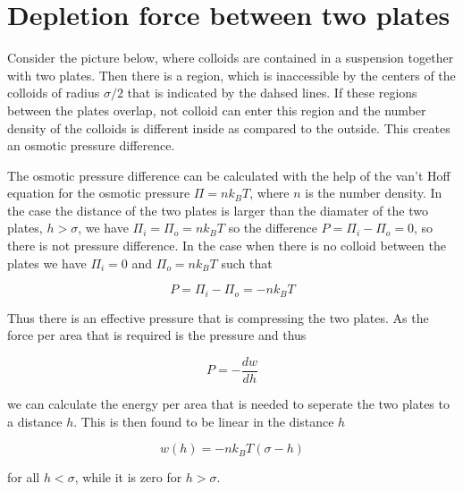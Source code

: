 \documentclass[letterpaper,10pt,english]{sphinxmanual}
\let\sphinxpxdimen\pdfpxdimen\else\newdimen\sphinxpxdimen
\begin{document}
\section{Depletion force between two plates}
\label{\detokenize{notebooks/L12/1_depletion_forces:Depletion-force-between-two-plates}}
\sphinxAtStartPar
Consider the picture below, where colloids are contained in a suspension together with two plates. Then there is a region, which is inaccessible by the centers of the colloids of radius \(\sigma/2\) that is indicated by the dahsed lines. If these regions between the plates overlap, not colloid can enter this region and the number density of the colloids is different inside as compared to the outside. This creates an osmotic pressure difference.

\noindent\sphinxincludegraphics[width=346\sphinxpxdimen,height=291\sphinxpxdimen]{{depletion_plates}.png}

\sphinxAtStartPar
The osmotic pressure difference can be calculated with the help of the van’t Hoff equation for the osmotic pressure \(\Pi=nk_B T\), where \(n\) is the number density. In the case the distance of the two plates is larger than the diamater of the two plates, \(h>\sigma\), we have \(\Pi_i=\Pi_o= nk_B T\) so the difference \(P=\Pi_i-\Pi_o=0\), so there is not pressure difference. In the case when there is no colloid between the plates we have \(\Pi_i =0\) and
\(\Pi_o =nk_B T\) such that

\sphinxAtStartPar
\begin{equation}
P=\Pi_i-\Pi_o=-nk_B T
\end{equation}

\sphinxAtStartPar
Thus there is an effective pressure that is compressing the two plates. As the force per area that is required is the pressure and thus

\sphinxAtStartPar
\begin{equation}
P=-\frac{dw}{dh}
\end{equation}

\sphinxAtStartPar
we can calculate the energy per area that is needed to seperate the two plates to a distance \(h\). This is then found to be linear in the distance \(h\)

\sphinxAtStartPar
\begin{equation}
w(h)=-n k_B T (\sigma-h)
\end{equation}

\sphinxAtStartPar
for all \(h<\sigma\), while it is zero for \(h>\sigma\).
\end{document}
